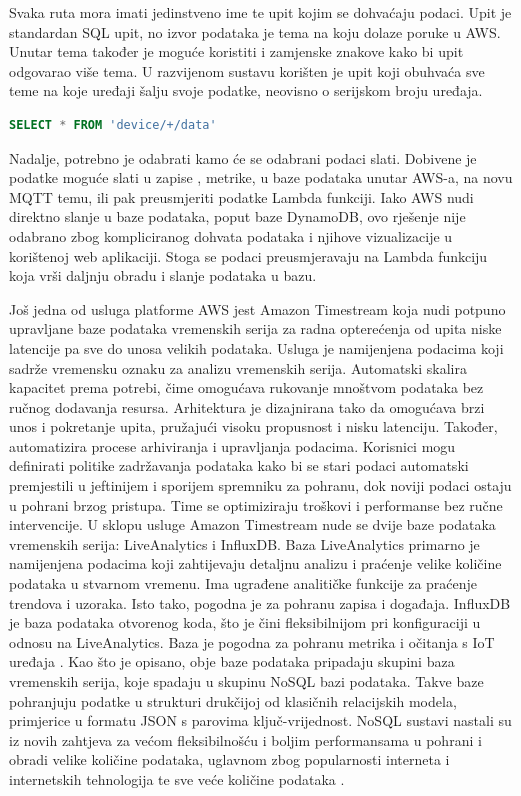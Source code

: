 Svaka ruta mora imati jedinstveno ime te upit kojim se dohvaćaju podaci. Upit je standardan SQL upit, no izvor podataka je tema na koju dolaze poruke u AWS. Unutar tema također je moguće koristiti i zamjenske znakove  kako bi upit odgovarao više tema. U razvijenom sustavu korišten je upit koji obuhvaća sve teme na koje uređaji šalju svoje podatke, neovisno o serijskom broju uređaja.

\begin{lstlisting}[caption={SQL upit rute za podatke s uređaja}, language=sql]
	SELECT * FROM 'device/+/data' 
\end{lstlisting}

Nadalje, potrebno je odabrati kamo će se odabrani podaci slati. Dobivene je podatke moguće slati u zapise , metrike, u baze podataka unutar AWS-a, na novu MQTT temu, ili pak preusmjeriti podatke Lambda funkciji. Iako AWS nudi direktno slanje u baze podataka, poput baze DynamoDB, ovo rješenje nije odabrano zbog kompliciranog dohvata podataka i njihove vizualizacije u korištenoj web aplikaciji. Stoga se podaci preusmjeravaju na Lambda funkciju koja vrši daljnju obradu i slanje podataka u bazu. 

Još jedna od usluga platforme AWS jest Amazon Timestream koja nudi potpuno upravljane baze podataka vremenskih serija za radna opterećenja od upita niske latencije pa sve do unosa velikih podataka. Usluga je namijenjena podacima koji sadrže vremensku oznaku za analizu vremenskih serija. Automatski skalira kapacitet prema potrebi, čime omogućava rukovanje mnoštvom podataka bez ručnog dodavanja resursa. Arhitektura je dizajnirana tako da omogućava brzi unos i pokretanje upita, pružajući visoku propusnost i nisku latenciju. Također, automatizira procese arhiviranja i upravljanja podacima. Korisnici mogu definirati politike zadržavanja podataka kako bi se stari podaci automatski premjestili u jeftinijem i sporijem spremniku za pohranu, dok noviji podaci ostaju u pohrani brzog pristupa. Time se optimiziraju troškovi i performanse bez ručne intervencije. U sklopu usluge Amazon Timestream nude se dvije baze podataka vremenskih serija: LiveAnalytics i InfluxDB. Baza LiveAnalytics primarno je namijenjena podacima koji zahtijevaju detaljnu analizu i praćenje velike količine podataka u stvarnom vremenu. Ima ugrađene analitičke funkcije za praćenje trendova i uzoraka. Isto tako, pogodna je za pohranu zapisa i događaja. InfluxDB je baza podataka otvorenog koda, što je čini fleksibilnijom pri konfiguraciji u odnosu na LiveAnalytics. Baza je pogodna za pohranu metrika i očitanja s IoT uređaja \cite{aws_docs}. Kao što je opisano, obje baze podataka pripadaju skupini baza vremenskih serija, koje spadaju u skupinu NoSQL bazi podataka. Takve baze pohranjuju podatke u strukturi drukčijoj od klasičnih relacijskih modela, primjerice u formatu JSON s parovima ključ-vrijednost. NoSQL sustavi nastali su iz novih zahtjeva za većom fleksibilnošću i boljim performansama u pohrani i obradi velike količine podataka, uglavnom zbog popularnosti interneta i internetskih tehnologija te sve veće količine podataka \cite{nosql}. 

